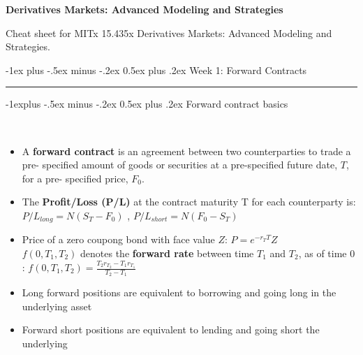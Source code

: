 \documentclass[10pt,landscape,a4paper]{article}
\makeatletter
\renewcommand{\section}{\@startsection{section}{1}{0mm}%
                                {-1ex plus -.5ex minus -.2ex}%
                                {0.5ex plus .2ex}%
                                {\normalfont\large\bfseries}}
\renewcommand{\subsection}{\@startsection{subsection}{2}{0mm}%
                                {-1explus -.5ex minus -.2ex}%
                                {0.5ex plus .2ex}%
                                {\normalfont\normalsize\bfseries}}
\makeatother
\begin{document}
\raggedright
\footnotesize
\begin{multicols*}{3}

\setlength{\premulticols}{1pt}
\setlength{\postmulticols}{1pt}
\setlength{\multicolsep}{1pt}
\setlength{\columnsep}{1pt}


\begin{center}
    {\color{blue} \Large{\textbf{Derivatives Markets: Advanced Modeling and Strategies}}} 
\end{center}


\scriptsize

Cheat sheet for MITx 15.435x Derivatives Markets: Advanced Modeling and Strategies.








\section{Week 1: Forward Contracts}\smallskip \hrule height 1pt \smallskip

\subsection{Forward contract basics}

\begin{description}[topsep=0pt]
	\item[Forward Contract] ~
	\begin{itemize}[topsep=0pt]
		\item A \textbf{forward contract} is an agreement between two counterparties to trade a pre-
		specified amount of goods or securities at a pre-specified future date, $T$, for a pre-
		specified price, $F_0$.
		\item The \textbf{Profit/Loss (P/L)} at the contract maturity T for each counterparty is:
		$P/L_{long} = N (S_T - F_0)$  , $P/L_{short} = N (F_0- S_T)$    
		\item  Price of a zero coupong bond with face value $Z$:  $P=e^{-r_T T}Z $\\
		$f(0,T_1,T_2)$ 	denotes the \textbf{forward rate} between time $T_1$ and $T_2$, as of
		time 0 : $f(0,T_1,T_2) = \frac{T_2 r_{T_2} - T_1 r_{T_1}}{T_2-T_1}$  
		\item Long forward positions are equivalent to borrowing and going long
		in the underlying asset
		\item Forward short positions are equivalent to lending and going short
		the underlying		
	\end{itemize}
\end{description}
 

\end{multicols*}
\end{document}
